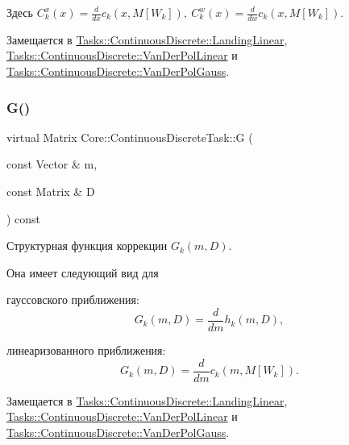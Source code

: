 Здесь $C_k^x(x) = \frac{d}{dx} c_k(x, M[W_k]),\ C_k^w(x) = \frac{d}{dw} c_k(x, M[W_k])$. 

Замещается в \hyperlink{class_tasks_1_1_continuous_discrete_1_1_landing_linear_a5b5a327866160bf687dbc6d82a801ce8}{Tasks\+::\+Continuous\+Discrete\+::\+Landing\+Linear}, \hyperlink{class_tasks_1_1_continuous_discrete_1_1_van_der_pol_linear_ac624f91abb5e440d9b05835ca281f53f}{Tasks\+::\+Continuous\+Discrete\+::\+Van\+Der\+Pol\+Linear} и \hyperlink{class_tasks_1_1_continuous_discrete_1_1_van_der_pol_gauss_adbd6671eb347348b68db28d899484336}{Tasks\+::\+Continuous\+Discrete\+::\+Van\+Der\+Pol\+Gauss}.

\hypertarget{class_core_1_1_continuous_discrete_task_a2bc6d34d112ec0999857f7f9e0f67dda}{}\label{class_core_1_1_continuous_discrete_task_a2bc6d34d112ec0999857f7f9e0f67dda} 
\subsubsection{\texorpdfstring{G()}{G()}}
{\footnotesize\ttfamily virtual Matrix Core\+::\+Continuous\+Discrete\+Task\+::G (\begin{DoxyParamCaption}\item[{const Vector \&}]{m,  }\item[{const Matrix \&}]{D }\end{DoxyParamCaption}) const\hspace{0.3cm}{\ttfamily [pure virtual]}}



Структурная функция коррекции $G_k(m, D)$. 

Она имеет следующий вид для


\begin{DoxyItemize}
\item гауссовского приближения\+: \[G_k(m, D) = \frac{d}{dm}h_k(m,D),\]
\item линеаризованного приближения\+: \[G_k(m, D) = \frac{d}{dm}c_k(m,M[W_k]).\] 
\end{DoxyItemize}

Замещается в \hyperlink{class_tasks_1_1_continuous_discrete_1_1_landing_linear_a3b589b0ac53f7fe936438bc7c82f5c3d}{Tasks\+::\+Continuous\+Discrete\+::\+Landing\+Linear}, \hyperlink{class_tasks_1_1_continuous_discrete_1_1_van_der_pol_linear_aad1f3c80a043157b90ba0b55ba2390b1}{Tasks\+::\+Continuous\+Discrete\+::\+Van\+Der\+Pol\+Linear} и \hyperlink{class_tasks_1_1_continuous_discrete_1_1_van_der_pol_gauss_a757eb311b72b3cabcee59eab9d732de5}{Tasks\+::\+Continuous\+Discrete\+::\+Van\+Der\+Pol\+Gauss}.

